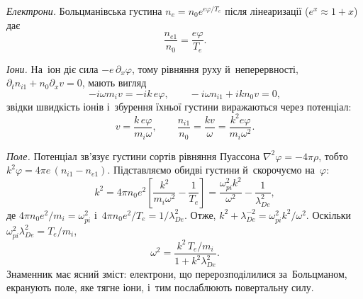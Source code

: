 \emph{Електрони.} Больцманівська густина $n_e=n_0e^{e\varphi/T_e}$ після лінеаризації
($e^{x}\approx1+x$) дає
\begin{equation*}
\frac{n_{e1}}{n_0}=\frac{e\varphi}{T_e}.
\end{equation*}

\emph{Іони.} На~іон діє сила $-e\,\partial_x\varphi$, тому рівняння руху й~неперервності, $\partial_tn_{i1}+n_0\partial_xv=0$, мають вигляд
\begin{equation*}
-i\omega m_iv=-ik\,e\varphi,
\qquad
-i\omega n_{i1}+ikn_0v=0,
\end{equation*}
звідки швидкість іонів і~збурення їхньої густини виражаються через потенціал:
\begin{equation*}
v=\frac{k\,e\varphi}{m_i\omega},
\qquad
\frac{n_{i1}}{n_0}=\frac{kv}{\omega}=\frac{k^2e\varphi}{m_i\omega^2}.
\end{equation*}

\emph{Поле.} Потенціал зв'язує густини сортів рівняння Пуассона $\nabla^2\varphi=-4\pi\rho$, тобто
$k^2\varphi=4\pi e\,(n_{i1}-n_{e1})$. Підставляємо обидві густини й~скорочуємо на~$\varphi$:
\begin{equation*}
k^2=4\pi n_0e^2\left[\frac{k^2}{m_i\omega^2}-\frac1{T_e}\right]
=\frac{\omega_{pi}^2k^2}{\omega^2}-\frac1{\lambda_{De}^2},
\end{equation*}
де $4\pi n_0e^2/m_i=\omega_{pi}^2$ і~$4\pi n_0e^2/T_e=1/\lambda_{De}^2$. Отже,
$k^2+\lambda_{De}^{-2}=\omega_{pi}^2k^2/\omega^2$. Оскільки $\omega_{pi}^2\lambda_{De}^2=T_e/m_i$,
\begin{equation*}
\omega^2=\frac{k^2\,T_e/m_i}{1+k^2\lambda_{De}^2}.
\end{equation*}
Знаменник має ясний зміст: електрони, що перерозподілилися за~Больцманом, екранують поле,
яке тягне іони, і~тим послаблюють повертальну силу.

